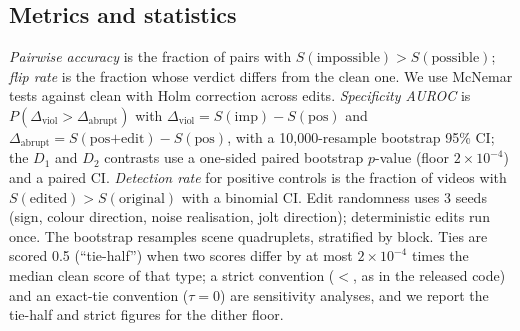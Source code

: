\subsection{Metrics and statistics}
\emph{Pairwise accuracy} is the fraction of pairs with $S(\text{impossible})>S(\text{possible})$; \emph{flip rate} is the fraction whose verdict differs from the clean one. We use McNemar tests against clean with Holm correction across edits. \emph{Specificity AUROC} is $P(\Delta_{\mathrm{viol}}>\Delta_{\mathrm{abrupt}})$ with $\Delta_{\mathrm{viol}}=S(\text{imp})-S(\text{pos})$ and $\Delta_{\mathrm{abrupt}}=S(\text{pos+edit})-S(\text{pos})$, with a 10{,}000-resample bootstrap 95\% CI; the $D_1$ and $D_2$ contrasts use a one-sided paired bootstrap $p$-value (floor $2\times10^{-4}$) and a paired CI. \emph{Detection rate} for positive controls is the fraction of videos with $S(\text{edited})>S(\text{original})$ with a binomial CI. Edit randomness uses 3 seeds (sign, colour direction, noise realisation, jolt direction); deterministic edits run once. The bootstrap resamples scene quadruplets, stratified by block. Ties are scored 0.5 (``tie-half'') when two scores differ by at most $2\times10^{-4}$ times the median clean score of that type; a strict convention ($<$, as in the released code) and an exact-tie convention ($\tau=0$) are sensitivity analyses, and we report the tie-half and strict figures for the dither floor.

